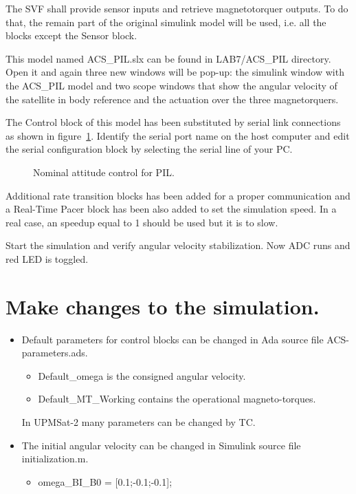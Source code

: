 The SVF shall provide sensor inputs and retrieve magnetotorquer outputs. To do that, the remain part of the original simulink model will be used, i.e. all the blocks except the Sensor block.

This model named ACS\_PIL.slx can be found in LAB7/ACS\_PIL directory. Open it and again three new windows will be pop-up: the simulink window with the ACS\_PIL model and two scope windows that show the angular velocity of the satellite in body reference and the actuation over the three magnetorquers.

The Control block of this model has been substituted by serial link connections as shown in figure~\ref{fig:nac-pil}. Identify the serial port name on the host computer and edit the serial configuration block by selecting the serial line of your PC.

\begin{figure}[h]
            \caption{Nominal attitude control for PIL.}
            \label{fig:nac-pil}
\end{figure}

Additional rate transition blocks has been added for a proper communication and a Real-Time Pacer block has been also added to set the simulation speed. In a real case, an speedup equal to 1 should be used but it is to slow.

Start the simulation and verify angular velocity stabilization. Now ADC runs and red LED is toggled. 

\section{Make changes to the simulation.}

\begin{itemize}
\item Default parameters for control blocks can be changed in Ada source file ACS-parameters.ads.
\begin{itemize}
\item Default\_omega is the consigned angular velocity.
\item Default\_MT\_Working contains the operational magneto-torques.
\end{itemize}

In UPMSat-2 many parameters can be changed by TC.
\item The initial angular velocity can be changed in Simulink source file initialization.m.
\begin{itemize}
\item omega\_BI\_B0 = [0.1;-0.1;-0.1];
\end{itemize}
\end{itemize}

